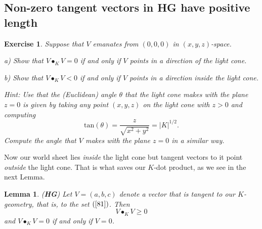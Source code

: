 \documentclass{article}%
\newtheorem{exercise}[theorem]{Exercise}
\newtheorem{lemma}[theorem]{Lemma}
\begin{document}
\subsection{Non-zero tangent vectors in \textbf{HG} have positive length}

\begin{exercise}
Suppose that $V$ emanates from $\left(  0,0,0\right)  $ in $\left(
x,y,z\right)  $-space.

a) Show that $V\bullet_{K}V=0$ if and only if $V$ points in a direction of the
light cone.

b) Show that $V\bullet_{K}V<0$ if and only if $V$ points in a direction inside
the light cone.

Hint: Use that the (Euclidean) angle $\theta$ that the light cone makes with
the plane $z=0$ is given by taking any point $\left(  x,y,z\right)  $ on the
light cone with $z>0$ and computing%
\[
\mathrm{tan}\left(  \theta\right)  =\frac{z}{\sqrt{x^{2}+y^{2}}}=\left\vert
K\right\vert ^{1/2}.
\]
Compute the angle that $V$ makes with the plane $z=0$ in a similar way.
\end{exercise}

Now our world sheet lies \textit{inside} the light cone but tangent vectors to
it point \textit{outside} the light cone. That is what saves our $K$-dot
product, as we see in the next Lemma.

\begin{lemma}
(\textbf{HG}) Let $V=\left(  a,b,c\right)  $ denote a vector that is tangent
to our $K$-geometry, that is, to the set $\left(  \ref{81}\right)  $. Then%
\[
V\bullet_{K}V\geq0
\]
and $V\bullet_{K}V=0$ if and only if $V=0$.
\end{lemma}
\end{document}
